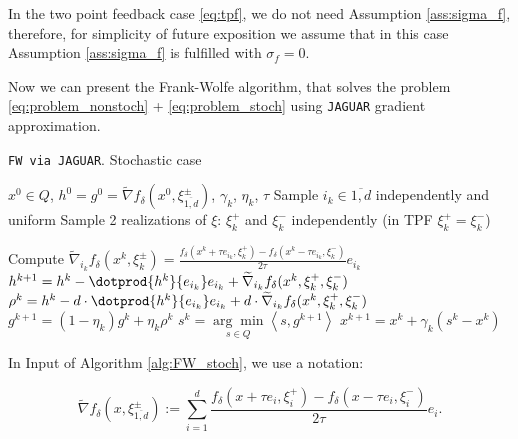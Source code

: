         In the two point feedback case \eqref{eq:tpf}, we do not need Assumption \ref{ass:sigma_f}, therefore, for simplicity of future exposition we assume that in this case Assumption \ref{ass:sigma_f} is fulfilled with $\sigma_f = 0$.
    
        Now we can present the Frank-Wolfe algorithm, that solves the problem \eqref{eq:problem_nonstoch} + \eqref{eq:problem_stoch} using \texttt{JAGUAR} gradient approximation.
    \vspace{-0.2cm}
        \begin{algorithm}[H]
    	\caption{\texttt{FW via JAGUAR}. Stochastic case}
    	\label{alg:FW_stoch}
        	\begin{algorithmic}[1]
        		 $x^0 \in Q$, $h^0 = g^0 = \widetilde\nabla f_{\delta}(x^0, \xi_{\overline{1, d}}^\pm)$, $\gamma_k$, $\eta_k$, $\tau$
                    \State Sample $i_k \in \overline{1, d}$ independently and uniform
                    \State Sample 2 realizations of $\xi$: $\xi^+_k$ and $\xi^-_k$ independently (in TPF $\xi_k^+= \xi_k^-$)
    
                    \State Compute
                    $\widetilde{\nabla}_{i_k} f_{\delta}(x^k, \xi^\pm_k) = \frac{f_{\delta}(x^k + \tau e_{i_k}, \xi^+_k) - f_{\delta}(x^k - \tau e_{i_k}, \xi^-_k)}{2 \tau} e_{i_k}$
                    \State $h^{k+1} = h^k - \dotprod{h^k}{e_{i_k}} e_{i_k} + \widetilde{\nabla}_{i_k} f_{\delta}(x^k, \xi^+_k, \xi^-_k)$ \label{line:h^k}
                    \State $\rho^{k} = h^{k} - d \cdot \dotprod{h^{k}}{e_{i_k}} e_{i_k} + d \cdot \widetilde{\nabla}_{i_k} f_{\delta}(x^k, \xi^+_k, \xi^-_k)$ \label{line:rho^k}
                    \State $g^{k+1} = (1 - \eta_k) g^k + \eta_k \rho^k$ \label{line:g^k}
                    \State $s^k = \underset{s \in Q}{\arg\min}\left<s, g^{k+1} \right>$ \label{line:s^k_stoch}
                    \State $x^{k+1} = x^k + \gamma_k (s^k - x^k)$ \label{line:x^k_stoch}
                \EndFor
        	\end{algorithmic}
        \end{algorithm}

        In Input of Algorithm \ref{alg:FW_stoch}, we use a notation:

        \begin{equation*}
                \widetilde{\nabla}f_{\delta}(x, \xi_{\overline{1, d}}^\pm) := \sum\limits_{i=1}^d \dfrac{f_{\delta}(x + \tau e_i, \xi_i^+) - f_{\delta}(x - \tau e_i, \xi_i^-)}{2 \tau} e_i.
        \end{equation*}
    
